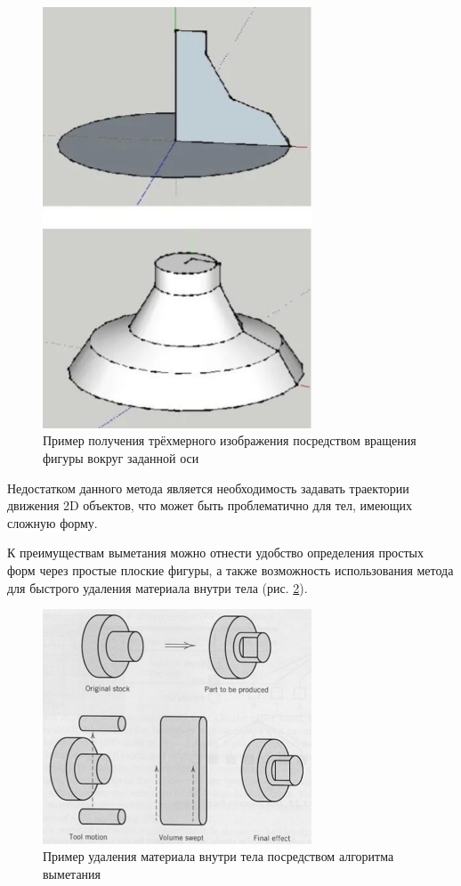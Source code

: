 \begin{figure}[h]
	\centering
	\captionsetup{justification=centering}
	\includegraphics[width=80mm]{img/sweeping.png}
	\caption{Пример получения трёхмерного изображения посредством 
		вращения фигуры вокруг заданной оси}
	\label{fig:sweeping}
\end{figure}

Недостатком данного метода является необходимость задавать траектории движения 2D объектов, что может быть проблематично для тел, имеющих сложную форму.

К преимуществам выметания можно отнести удобство определения простых форм через простые плоские фигуры, а также возможность использования метода для быстрого удаления материала внутри тела (рис. \ref{fig:deleting}). 
\newpage
\begin{figure}[h]
	\centering
	\captionsetup{justification=centering}
	\includegraphics[width=80mm]{img/deleting.png}
	\caption{Пример удаления материала внутри тела посредством 
		алгоритма выметания}
	\label{fig:deleting}
\end{figure}


